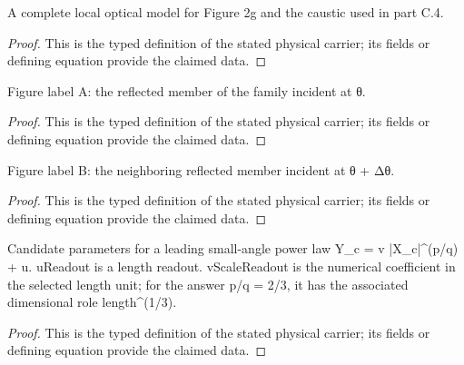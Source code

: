 \begin{definition}
  \label{def:physics:IPhO_2026_2_C_4:aux009}
  A complete local optical model for Figure 2g and the caustic used in part C.4.
\end{definition}
\begin{proof}
  This is the typed definition of the stated physical carrier; its fields or defining equation provide the claimed data.
\end{proof}

\begin{definition}
  \label{def:physics:IPhO_2026_2_C_4:aux010}
  Figure label A: the reflected member of the family incident at θ.
\end{definition}
\begin{proof}
  This is the typed definition of the stated physical carrier; its fields or defining equation provide the claimed data.
\end{proof}

\begin{definition}
  \label{def:physics:IPhO_2026_2_C_4:aux011}
  Figure label B: the neighboring reflected member incident at θ + Δθ.
\end{definition}
\begin{proof}
  This is the typed definition of the stated physical carrier; its fields or defining equation provide the claimed data.
\end{proof}

\begin{definition}
  \label{def:physics:IPhO_2026_2_C_4:aux012}
  Candidate parameters for a leading small-angle power law Y\_c = v |X\_c|\textasciicircum{}(p/q) + u. uReadout is a length readout. vScaleReadout is the numerical coefficient in the selected length unit; for the answer p/q = 2/3, it has the associated dimensional role length\textasciicircum{}(1/3).
\end{definition}
\begin{proof}
  This is the typed definition of the stated physical carrier; its fields or defining equation provide the claimed data.
\end{proof}


